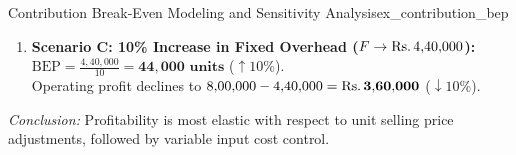 \begin{example}{Contribution Break-Even Modeling and Sensitivity Analysis}{ex_contribution_bep}
\begin{enumerate}[leftmargin=*, noitemsep, topsep=2pt]
    \item \textbf{Scenario C: 10\% Increase in Fixed Overhead ($F \to \text{Rs.}\, 4{,}40{,}000$):} \\
    $\text{BEP} = \frac{4{,}40{,}000}{10} = \mathbf{44{,}000 \text{ units}}$ ($\uparrow 10\%$). \\
    Operating profit declines to $8{,}00{,}000 - 4{,}40{,}000 = \mathbf{\text{Rs.}\, 3{,}60{,}000}$ ($\downarrow 10\%$).
\end{enumerate}
\vspace{2pt}
\textit{Conclusion:} Profitability is most elastic with respect to unit selling price adjustments, followed by variable input cost control.
\end{example}
